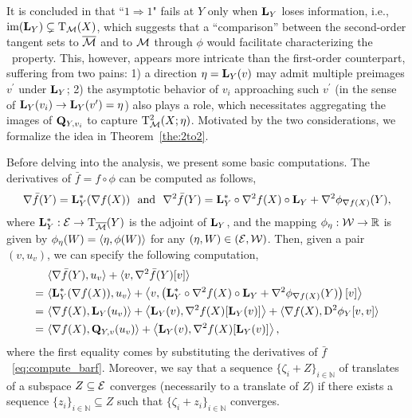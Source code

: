It is concluded in \cite[Theorem 2.4]{levin2025effect} that ``$1\!\Rightarrow\!1$" fails at $Y$ only when $\mathrm{\bf L}_Y$ loses information, i.e., $\operatorname{im}(\mathrm{\bf L}_Y)\subsetneq\mathrm{T}_{\mathcal{M}}(X)$, which suggests that a ``comparison'' between the second-order tangent sets to $\overline{\mathcal{M}}$ and to $\mathcal{M}$ through $\phi$ would facilitate characterizing the \twototwo\ property. This, however, appears more intricate than the first-order counterpart, suffering from two pains: 1) a direction $\eta=\mathrm{\bf L}_Y(v)$ may admit multiple preimages $v^\prime$ under $\mathrm{\bf L}_Y$; 2) the asymptotic behavior of $v_i$ approaching such $v^\prime$ (in the sense of $\mathrm{\bf L}_Y(v_i)\to\mathrm{\bf L}_Y(v^\prime)=\eta$) also plays a role, which necessitates aggregating the images of $\mathrm{\bf Q}_{Y,v_i}$ to capture $\mathrm{T}^2_{\mathcal{M}}(X;\eta)$. Motivated by the two considerations, we formalize the idea in Theorem~\ref{the:2to2}.




Before delving into the analysis, we present some basic computations. The derivatives of $\bar{f}=f\circ\phi$ can be computed as follows,
\begin{equation}\label{eq:compute_barf}
    \nabla \bar{f}(Y)=\mathrm{\bf L}^*_Y(\nabla f(X))\ \ \text{and}\ \ \nabla^2 \bar{f}(Y) = \mathrm{\bf L}^*_Y\circ \nabla^2 f(X)\circ\mathrm{\bf L}_Y + \nabla^2\phi_{\nabla f(X)}(Y),
\end{equation}
where $\mathrm{\bf L}^*_Y:\mathcal{E}\to\mathrm{T}_{\overline{\mathcal{M}}}(Y)$ is the adjoint of $\mathrm{\bf L}_Y$, and the mapping $\phi_\eta:\mathcal{W}\to\mathbb{R}$ is given by $\phi_{\eta}(W)=\langle {\eta,\phi(W)} \rangle$ for any $(\eta,W)\in(\mathcal{E},\mathcal{W})$. Then, given a pair $(v,u_v)$, we can specify the following computation,
\begin{align}
        &\ \langle {\nabla \bar{f}(Y),u_v} \rangle+\langle {v,\nabla^2 
        \bar{f}(Y)[v]} \rangle  \nonumber
        \\
        =&\ \langle {\mathrm{\bf L}_Y^*(\nabla f(X)),u_v} \rangle + \left\langle v, \left( {\mathrm{\bf L}^*_Y\circ \nabla^2 f(X)\circ\mathrm{\bf L}_Y + \nabla^2\phi_{\nabla f(X)}(Y)} \right)[v]\right \rangle    \nonumber
        \\
        =&\ \langle {\nabla f(X),\mathrm{\bf L}_Y(u_v)} \rangle + \left\langle\mathrm{\bf L}_Y(v),\nabla^2 f(X)[\mathrm{\bf L}_Y(v)]\right \rangle + \langle {\nabla f(X),\mathrm{D}^2\phi_Y[v,v]} \rangle    \nonumber
        \\
        =&\ \langle {\nabla f(X),\mathrm{\bf Q}_{Y,v}(u_v)} \rangle  + \left\langle\mathrm{\bf L}_Y(v),\nabla^2 f(X)[\mathrm{\bf L}_Y(v)]\right \rangle, \label{eq:2order_deri}
\end{align}
where the first equality comes by substituting the derivatives of $\bar{f}$~\eqref{eq:compute_barf}. Moreover, we say that a sequence $\{\zeta_i+Z\}_{i\in\mathbb{N}}$ of translates of a subspace $Z\subseteq\mathcal{E}$ converges (necessarily to a translate of $Z$) if there exists a sequence $\{z_i\}_{i\in\mathbb{N}}\subseteq Z$ such that $\{\zeta_i+z_i\}_{i\in\mathbb{N}}$ converges.

